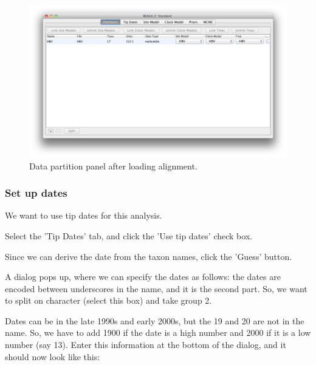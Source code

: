 \documentclass{article}
\begin{document}
\begin{figure}
\begin{center}

\includegraphics[scale=0.4]{figures/BEAUti_DataPartitions}

\end{center}
\caption{\label{fig.datapartition} Data partition panel after loading alignment.}
\end{figure}

\subsubsection*{Set up dates}

We want to use tip dates for this analysis.

Select the 'Tip Dates' tab, and click the 'Use tip dates' check box.

Since we can derive the date from the taxon names, click the 'Guess' button.

A dialog pops up, where we can specify the dates as follows: the dates are encoded between underscores in the name, and it is the second part. So, we want to split on character (select this box) and take group 2.

Dates can be in the late 1990s and early 2000s, but the 19 and 20 are not in the name. So, we have to add 1900 if the date is a high number and 2000 if it is a low number (say 13). Enter this information at the bottom of the dialog, and it should now look like this:
\end{document}

